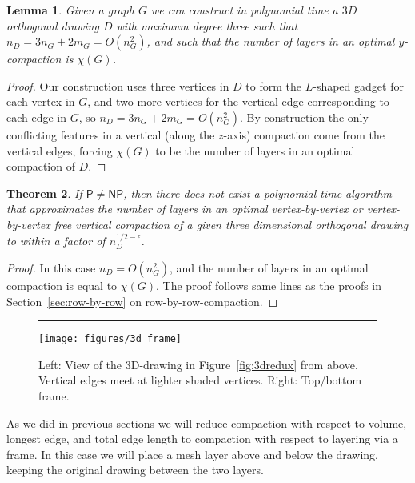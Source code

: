 \documentclass[12pt]{article}
\newtheorem{theorem}{Theorem}
\newtheorem{lemma}[theorem]{Lemma}
\theoremstyle{definitions}
\renewcommand{\P}{\mathsf{P}}
\newcommand{\NP}{\mathsf{NP}}
\begin{document}
\begin{lemma}
\label{lem:3dconst}
Given a graph $G$ we can construct in polynomial time a $3D$ orthogonal drawing $D$ with maximum degree three such that $n_D = 3n_G+2m_G=O(n_G^2)$, and such that the number of layers in an optimal $y$-compaction is $\chi(G)$.
\end{lemma}

\begin{proof}
Our construction uses three vertices in $D$ to form the $L$-shaped gadget for each vertex in $G$, and two more vertices for the vertical edge corresponding to each edge in $G$, so $n_D = 3n_G + 2m_G = O(n_G^2)$. By construction the only conflicting features in a vertical (along the $z$-axis) compaction come from the vertical edges, forcing $\chi(G)$ to be the number of layers in an optimal compaction of $D$.
\end{proof}

\begin{theorem}
If $\P \neq \NP$, then there does not exist a polynomial time algorithm that
approximates the number of layers in an optimal vertex-by-vertex or vertex-by-vertex free vertical compaction of a given
three dimensional orthogonal drawing to within a factor of $n_D^{1/2-\epsilon}$.
\end{theorem}
\begin{proof}
In this case $n_D = O(n_G^2)$, and the number of layers in an optimal compaction is equal to $\chi(G)$. The proof follows same lines as the proofs in Section~\ref{sec:row-by-row} on row-by-row-compaction.
\end{proof}

\begin{figure}[b!]
\centering
{}\rule{2em}{0em}
\texttt{[image: figures/3d\_frame]}
\caption{Left: View of the 3D-drawing in Figure~\ref{fig:3dredux} from above. Vertical
edges meet at lighter shaded vertices. Right: Top/bottom frame.
}
\label{fig:3dreduxTopDown}
\end{figure}
As we did in previous sections we will reduce compaction with respect to volume,
longest edge, and total edge length to compaction with respect to layering via a frame. 
In this case we will place a mesh layer above and below the drawing, keeping the original drawing between the two layers.
\end{document}
